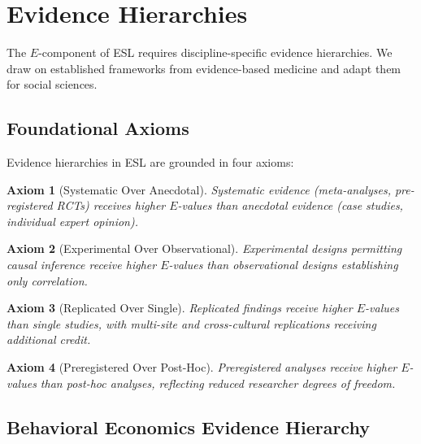 \documentclass[11pt,a4paper]{article}
\newtheorem{axiom}{Axiom}[section]
\begin{document}
\section{Evidence Hierarchies}
\label{sec:evidence}


The $E$-component of ESL requires discipline-specific evidence hierarchies. We draw on established frameworks from evidence-based medicine \citep{GRADE2004, OxfordCEBM2011} and adapt them for social sciences.

\subsection{Foundational Axioms}

Evidence hierarchies in ESL are grounded in four axioms:

\begin{axiom}[Systematic Over Anecdotal]
\label{ax:systematic}
Systematic evidence (meta-analyses, pre-registered RCTs) receives higher $E$-values than anecdotal evidence (case studies, individual expert opinion).
\end{axiom}

\begin{axiom}[Experimental Over Observational]
\label{ax:experimental}
Experimental designs permitting causal inference receive higher $E$-values than observational designs establishing only correlation.
\end{axiom}

\begin{axiom}[Replicated Over Single]
\label{ax:replicated}
Replicated findings receive higher $E$-values than single studies, with multi-site and cross-cultural replications receiving additional credit.
\end{axiom}

\begin{axiom}[Preregistered Over Post-Hoc]
\label{ax:preregistered}
Preregistered analyses receive higher $E$-values than post-hoc analyses, reflecting reduced researcher degrees of freedom.
\end{axiom}

\subsection{Behavioral Economics Evidence Hierarchy}
\end{document}
